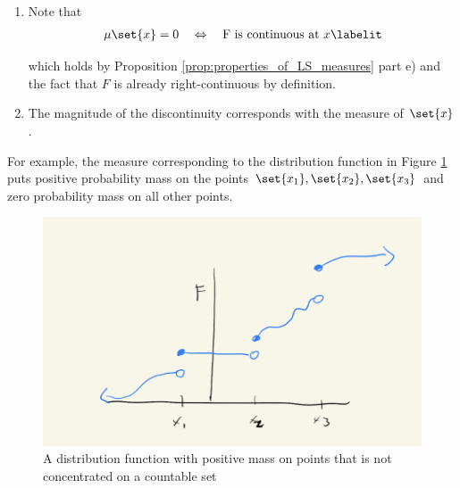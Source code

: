 \documentclass{article} %
\begin{document}
\begin{remark}{}
\;
\begin{enumerate}
\item Note that
\begin{align*} 
\mu\set{x} = 0 \quad \Leftrightarrow \quad \text{F is continuous at } x
\labelit\label {eqn:continuity_at_a_point_iffi_measure_zero_at_a_point}
\end{align*} 

which holds by Proposition \ref{prop:properties_of_LS_measures} part e) and the fact that $F$ is already right-continuous by definition. 

\item The magnitude of the discontinuity corresponds with the measure of $\set{x}$. 
\end{enumerate}

 For example, the measure corresponding to the distribution function in Figure \ref{fig:distribution_function_with_positive_mass_on_points_that_is_not_concentrated_on_a_countable_set} puts positive probability mass on the points $\set{x_1}, \set{x_2}, \set{x_3}$ and zero probability mass on all other points. 

 \begin{figure}[H]
 \centering
 \includegraphics[width=.5\textwidth]{images/distribution_function_with_positive_mass_on_points_that_is_not_concentrated_on_a_countable_set}
 \caption{A distribution function with positive mass on points that is not concentrated on a countable set}	
\label{fig:distribution_function_with_positive_mass_on_points_that_is_not_concentrated_on_a_countable_set}
\end{figure}


   
\label{rk:continuity_at_a_point_iffi_measure_zero_at_a_point}
\end{remark}
\end{document}
